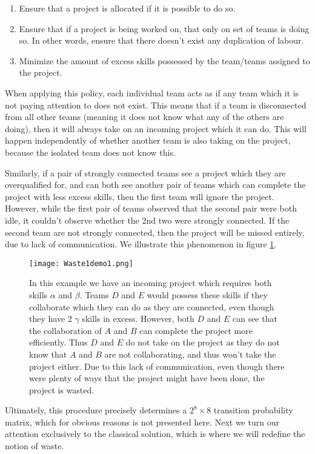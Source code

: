 \begin{enumerate}
	\item Ensure that a project is allocated if it is possible to do so.
	\item Ensure that if a project is being worked on, that only on set of teams is doing so. In other words, ensure that there doesn't exist any duplication of labour.
	\item Minimize the amount of excess skills possessed by the team/teams assigned to the project.
\end{enumerate}

When applying this policy, each individual team acts as if any team which it is not paying attention to does not exist. This means that if a team is disconnected from all other teams (meaning it does not know what any of the others are doing), then it will always take on an incoming project which it can do. This will happen independently of whether another team is also taking on the project, because the isolated team does not know this. 

Similarly, if a pair of strongly connected teams see a project which they are overqualified for, and can both see another pair of teams which can complete the project with less excess skills, then the first team will ignore the project. However, while the first pair of teams observed that the second pair were both idle, it couldn't observe whether the 2nd two were strongly connected. If the second team are not strongly connected, then the project will be missed entirely, due to lack of communication. We illustrate this phenomenon in figure \ref{fig:waste1demo1}.

\begin{figure}[ht]
	\centering	
	\texttt{[image: Waste1demo1.png]}
	\caption{In this example we have an incoming project which requires both skills $\alpha$ and $\beta$. Teams $D$ and $E$ would possess these skills if they collaborate which they can do as they are connected, even though they have 2 $\gamma$ skills in excess. However, both $D$ and $E$ can see that the collaboration of $A$ and $B$ can complete the project more efficiently. Thus $D$ and $E$ do not take on the project as they do not know that $A$ and $B$ are not collaborating, and thus won't take the project either. Due to this lack of communication, even though there were plenty of ways that the project might have been done, the project is wasted.}
	\label{fig:waste1demo1}
\end{figure}

Ultimately, this procedure precisely determines a $2^8 \times 8$ transition probability matrix, which for obvious reasons is not presented here. Next we turn our attention exclusively to the classical solution, which is where we will redefine the notion of waste.

